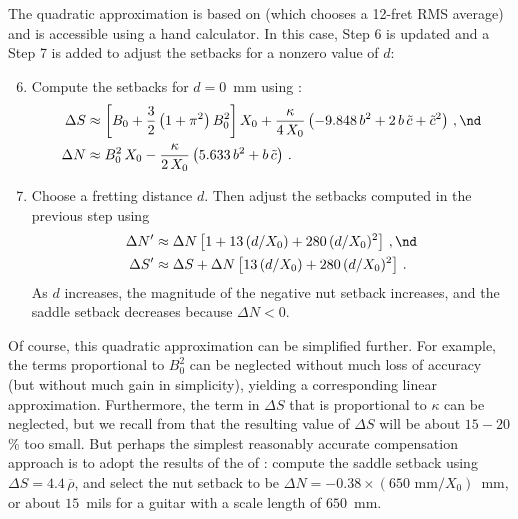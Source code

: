 The quadratic approximation is based on  (which chooses a 12-fret RMS average) and  is accessible using a hand calculator. In this case, Step 6 is updated and a Step 7 is added to adjust the setbacks for a nonzero value of $d$:
\begin{enumerate}
    \setcounter{enumi}{5}
    \item Compute the setbacks for $d = 0$~mm using :
    \begin{align*}
        \Delta S &\approx \left[ B_0 + \frac{3}{2} \left(1 + \pi^2\right) B_0^2 \right] X_0 + \frac{\kappa}{4\, X_0} \left( -9.848\, b^2 + 2\, b\, \tilde{c} + \tilde{c}^2 \right)\, , \nd \\
        \Delta N &\approx B_0^2\, X_0 - \frac{\kappa}{2\, X_0} \left( 5.633\, b^2 + b\, \tilde{c} \right)\, .
    \end{align*}
    \item Choose a fretting distance $d$. Then adjust the setbacks computed in the previous step using
    \begin{align*}
        \Delta N^\prime &\approx \Delta N \left[ 1 + 13\, (d/X_0) + 280\, (d/X_0)^2 \right]\, , \nd \\
        \Delta S^\prime &\approx \Delta S + \Delta N \left[13\, (d/X_0) + 280\, (d/X_0)^2 \right]\, .
    \end{align*}
    As $d$ increases, the magnitude of the negative nut setback increases, and the saddle setback decreases because $\Delta N < 0$. 
\end{enumerate}
Of course, this quadratic approximation can be simplified further. For example, the terms proportional to $B_0^2$ can be neglected without much loss of accuracy (but without much gain in simplicity), yielding a corresponding linear approximation. Furthermore, the term in $\Delta S$ that is proportional to $\kappa$ can be neglected, but we recall from  that the resulting value of $\Delta S$ will be about  $15 - 20$\% too small. But perhaps the simplest reasonably accurate compensation approach is to adopt the results of the of : compute the saddle setback using $\Delta S = 4.4\, \overline{\rho}$, and select the nut setback to be $\Delta N = -0.38 \times (650 \textrm{ mm} / X_0)$~mm, or about $15$~mils for a guitar with a scale length of $650$~mm.

